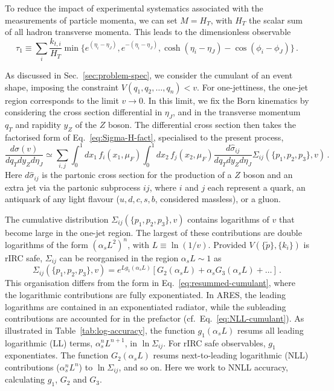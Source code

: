 To reduce the impact of experimental systematics associated with the measurements of particle momenta, 
we can set $M=H_T$, with $H_T$ the scalar sum of all hadron transverse
momenta. This leads to the dimensionless observable
\begin{equation}
	\label{eq:tau1-binv}
	\tau_1\equiv  \sum_{i} \frac{k_{t,i}}{H_T}\min\{e^{(\eta_i-\eta_J)}, e^{-(\eta_i-\eta_J)}, \cosh(\eta_{i}-\eta_J)-\cos(\phi_{i}-\phi_J)\}\,.
\end{equation}

As discussed in Sec.~\ref{sec:problem-spec}, we consider the cumulant
of an event shape, imposing the constraint
$V(q_1,q_2,\dots,q_n)<v$. For one-jettiness, the one-jet region
corresponds to the limit $v\to0$. In this limit, we fix the Born
kinematics by considering the cross section differential in $\eta_J$,
and in the transverse momentum $q_T$ and rapidity $y_Z$ of the $Z$ boson.
The differential cross section then takes the factorised form of
Eq.~\eqref{eq:Sigma-H-fact}, specialised to the present process,
\begin{equation}
  \label{eq:dsigma-def}
  \frac{d\sigma(v)}{dq_T dy_Zd\eta_J} \simeq \sum_{i,j} \int_0^1 \!\! dx_1\, f_i(x_1,\mu_F)\int_0^1 \!\! dx_2\, f_j(x_2,\mu_F)\frac{d\hat \sigma_{ij}}{dq_Tdy_Zd\eta_J} \Sigma_{ij}(\{p_1,p_2,p_3\},v)\,.
\end{equation}
Here $d\hat{\sigma}_{ij}$ is the partonic cross section
for the production of a $Z$ boson and an extra jet via the partonic
subprocess $ij$, where $i$ and $j$ each represent a quark, an antiquark of any
light flavour ($u,d,c,s,b$, considered massless), or a gluon. 

The cumulative distribution $\Sigma_{ij}(\{p_1,p_2,p_3\},v)$ contains
logarithms of $v$ that become large in the one-jet region. The
largest of these contributions are double logarithms of the form
$(\alpha_s L^2)^n$, with $L\equiv \ln(1/v)$. Provided $V(\{\tilde p\},\{k_i\})$
is rIRC safe, $\Sigma_{ij}$ can be reorganised in the region
$\alpha_s L\sim 1$ as
\begin{equation}
  \label{eq:log-counting}
  \Sigma_{ij}(\{p_1,p_2,p_3\},v) = e^{L g_1(\alpha_s L)}\left[G_2(\alpha_s L)+ \alpha_s G_3(\alpha_s L)+\dots\right]\,.
\end{equation}
This organisation differs from the form in
Eq.~\eqref{eq:resummed-cumulant}, where the logarithmic contributions
are fully exponentiated. In \textsc{ARES}, the leading logarithms are
contained in an exponentiated radiator, while the subleading
contributions are accounted for in the prefactor (cf.\  Eq.~\eqref{eq:NLL-cumulant}).
As illustrated in Table~\ref{tab:log-accuracy}, the
function $g_1(\alpha_s L)$ resums all leading logarithmic (LL) terms,
$\alpha_s^n L^{n+1}$, in $\ln\Sigma_{ij}$. For rIRC safe observables,
$g_1$ exponentiates. The function $G_2(\alpha_s L)$ resums
next-to-leading logarithmic (NLL) contributions ($\alpha_s^n L^n$) to
$\ln\Sigma_{ij}$, and so on. Here we work to NNLL accuracy, 
calculating $g_1$, $G_2$ and $G_3$.


